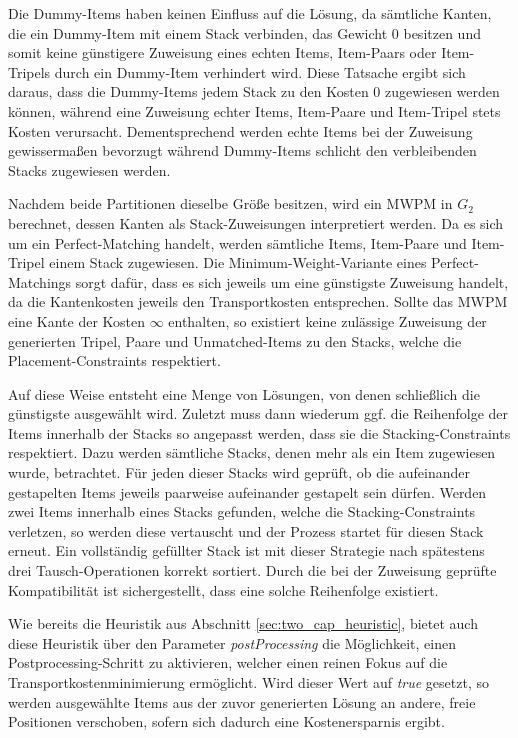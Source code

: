 Die Dummy-Items haben keinen Einfluss auf die Lösung, da sämtliche Kanten, die ein Dummy-Item mit einem Stack verbinden,
das Gewicht $0$ besitzen und somit keine günstigere Zuweisung eines echten Items, Item-Paars oder Item-Tripels durch ein Dummy-Item
verhindert wird. Diese Tatsache ergibt sich daraus, dass die Dummy-Items jedem Stack zu den Kosten $0$ zugewiesen werden können,
während eine Zuweisung echter Items, Item-Paare und Item-Tripel stets Kosten verursacht. Dementsprechend werden echte Items bei der
Zuweisung gewissermaßen bevorzugt während Dummy-Items schlicht den verbleibenden Stacks zugewiesen werden.

Nachdem beide Partitionen dieselbe Größe besitzen, wird ein \textsc{MWPM} in $G_2$ berechnet, dessen Kanten
als Stack-Zuweisungen interpretiert werden. Da es sich um ein Perfect-Matching handelt, werden sämtliche Items, Item-Paare
und Item-Tripel einem Stack zugewiesen. Die Minimum-Weight-Variante eines Perfect-Matchings sorgt dafür, dass es sich
jeweils um eine günstigste Zuweisung handelt, da die Kantenkosten jeweils den Transportkosten entsprechen.
Sollte das \textsc{MWPM} eine Kante der Kosten $\infty$ enthalten, so existiert keine zulässige Zuweisung
der generierten Tripel, Paare und Unmatched-Items zu den Stacks, welche die Placement-Constraints respektiert.

Auf diese Weise entsteht eine Menge von Lösungen, von denen schließlich die günstigste ausgewählt wird.
Zuletzt muss dann wiederum ggf. die Reihenfolge der Items innerhalb der Stacks so angepasst werden,
dass sie die Stacking-Constraints respektiert. Dazu werden sämtliche Stacks, denen mehr als
ein Item zugewiesen wurde, betrachtet. Für jeden dieser Stacks wird geprüft, ob die aufeinander
gestapelten Items jeweils paarweise aufeinander gestapelt sein dürfen.
Werden zwei Items innerhalb eines Stacks gefunden, welche die Stacking-Constraints verletzen, so werden diese
vertauscht und der Prozess startet für diesen Stack erneut. Ein vollständig gefüllter Stack ist mit dieser
Strategie nach spätestens drei Tausch-Operationen korrekt sortiert. Durch die bei der Zuweisung geprüfte
Kompatibilität ist sichergestellt, dass eine solche Reihenfolge existiert.

Wie bereits die Heuristik aus Abschnitt \ref{sec:two_cap_heuristic}, bietet auch diese Heuristik über den Parameter
\textit{postProcessing} die Möglichkeit, einen Postprocessing-Schritt zu aktivieren, welcher einen reinen Fokus
auf die Transportkostenminimierung ermöglicht. Wird dieser Wert auf \textit{true} gesetzt, so werden ausgewählte Items aus der zuvor generierten Lösung an andere, freie Positionen verschoben, sofern sich dadurch eine Kostenersparnis ergibt.

